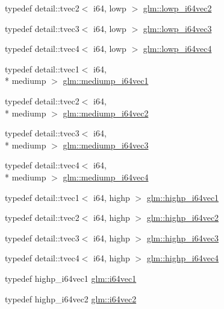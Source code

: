 \begin{DoxyCompactItemize}
typedef detail\-::tvec2$<$ i64, lowp $>$ \hyperlink{group__gtc__type__precision_gad88a04aaa07fabf57fdbad8e6b7bcc9c}{glm\-::lowp\-\_\-i64vec2}
\item 
typedef detail\-::tvec3$<$ i64, lowp $>$ \hyperlink{group__gtc__type__precision_gaa42f666ccdb6d1ef6326882b4f377678}{glm\-::lowp\-\_\-i64vec3}
\item 
typedef detail\-::tvec4$<$ i64, lowp $>$ \hyperlink{group__gtc__type__precision_ga95c13b9d4f94d1783e7d96534d1651d8}{glm\-::lowp\-\_\-i64vec4}
\item 
typedef detail\-::tvec1$<$ i64, \\*
mediump $>$ \hyperlink{group__gtc__type__precision_gad2423a91c791b9ca2f8a3ecfc71b080d}{glm\-::mediump\-\_\-i64vec1}
\item 
typedef detail\-::tvec2$<$ i64, \\*
mediump $>$ \hyperlink{group__gtc__type__precision_ga5cf0bec13b01b6124e966360cffe15a4}{glm\-::mediump\-\_\-i64vec2}
\item 
typedef detail\-::tvec3$<$ i64, \\*
mediump $>$ \hyperlink{group__gtc__type__precision_gae1aa82d2b9a62a87648306205dfe69ab}{glm\-::mediump\-\_\-i64vec3}
\item 
typedef detail\-::tvec4$<$ i64, \\*
mediump $>$ \hyperlink{group__gtc__type__precision_gab4db11ebb425fa18fe5d15d455c360a3}{glm\-::mediump\-\_\-i64vec4}
\item 
typedef detail\-::tvec1$<$ i64, highp $>$ \hyperlink{group__gtc__type__precision_ga06c21aba992669f5c160ec5f5a480522}{glm\-::highp\-\_\-i64vec1}
\item 
typedef detail\-::tvec2$<$ i64, highp $>$ \hyperlink{group__gtc__type__precision_gabfe3aa6fa4003a47577beb9678ab2661}{glm\-::highp\-\_\-i64vec2}
\item 
typedef detail\-::tvec3$<$ i64, highp $>$ \hyperlink{group__gtc__type__precision_ga4030f8ad15da56f5e427aa457d39e888}{glm\-::highp\-\_\-i64vec3}
\item 
typedef detail\-::tvec4$<$ i64, highp $>$ \hyperlink{group__gtc__type__precision_ga0ea279cd954fbb71a1db62e897d4d7f5}{glm\-::highp\-\_\-i64vec4}
\item 
typedef highp\-\_\-i64vec1 \hyperlink{group__gtc__type__precision_ga8bc234da7e4a6436e01241f439fc7ddd}{glm\-::i64vec1}
\item 
typedef highp\-\_\-i64vec2 \hyperlink{group__gtc__type__precision_ga75461c98baf3e3913566550bd9d8d17f}{glm\-::i64vec2}
\item 

\end{DoxyCompactItemize}
